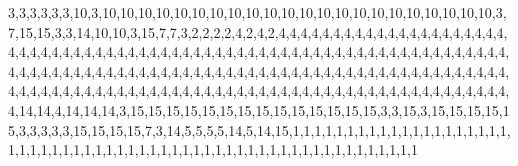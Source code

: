 3,3,3,3,3,3,10,3,10,10,10,10,10,10,10,10,10,10,10,10,10,10,10,10,10,10,10,10,10,10,3,7,15,15,3,3,14,10,10,3,15,7,7,3,2,2,2,2,4,2,4,2,4,4,4,4,4,4,4,4,4,4,4,4,4,4,4,4,4,4,4,4,4,4,4,4,4,4,4,4,4,4,4,4,4,4,4,4,4,4,4,4,4,4,4,4,4,4,4,4,4,4,4,4,4,4,4,4,4,4,4,4,4,4,4,4,4,4,4,4,4,4,4,4,4,4,4,4,4,4,4,4,4,4,4,4,4,4,4,4,4,4,4,4,4,4,4,4,4,4,4,4,4,4,4,4,4,4,4,4,4,4,4,4,4,4,4,4,4,4,4,4,4,4,4,4,4,4,4,4,4,4,4,4,4,4,4,4,4,4,4,4,4,4,4,4,4,4,4,4,4,4,4,4,4,4,4,4,4,4,4,4,14,14,4,14,14,14,3,15,15,15,15,15,15,15,15,15,15,15,15,15,15,3,3,15,3,15,15,15,15,15,3,3,3,3,3,15,15,15,15,7,3,14,5,5,5,5,14,5,14,15,1,1,1,1,1,1,1,1,1,1,1,1,1,1,1,1,1,1,1,1,1,1,1,1,1,1,1,1,1,1,1,1,1,1,1,1,1,1,1,1,1,1,1,1,1,1,1,1,1,1,1,1,1,1,1,1,1,1
